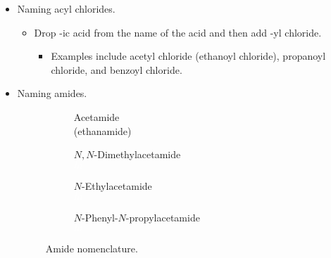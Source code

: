 \documentclass[../notes.tex]{subfiles}
\begin{document}
\begin{itemize}
\begin{itemize}
    \end{itemize}
    \item Naming acyl chlorides.
    \begin{itemize}
        \item Drop -ic acid from the name of the acid and then add -yl chloride.
        \begin{itemize}
            \item Examples include acetyl chloride (ethanoyl chloride), propanoyl chloride, and benzoyl chloride.
        \end{itemize}
    \end{itemize}
    \item Naming amides.
    \begin{figure}[H]
        \centering
        \footnotesize
        \captionsetup{justification=centering}
        \begin{subfigure}[b]{0.24\linewidth}
            \centering
            \caption*{Acetamide\\(ethanamide)}
            \label{fig:amideNomenclaturea}
        \end{subfigure}
        \begin{subfigure}[b]{0.24\linewidth}
            \centering
            \caption*{$N,N$-\textcolor{rex}{Dimethyl}acetamide\\${\color{white}hi}$}
            \label{fig:amideNomenclatureb}
        \end{subfigure}
        \begin{subfigure}[b]{0.24\linewidth}
            \centering
            \vspace{2mm}
            \caption*{$N$-\textcolor{rex}{Ethyl}acetamide\\${\color{white}hi}$}
            \label{fig:amideNomenclaturec}
        \end{subfigure}
        \begin{subfigure}[b]{0.26\linewidth}
            \centering
            \caption*{$N$-\textcolor{rex}{Phenyl}-$N$-\textcolor{grx}{propyl}acetamide\\${\color{white}hi}$}
            \label{fig:amideNomenclatured}
        \end{subfigure}
        \caption{Amide nomenclature.}

\end{figure}
\end{itemize}
\end{document}
